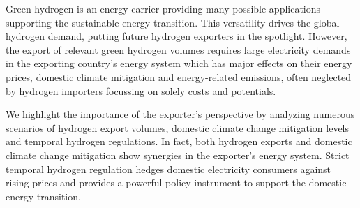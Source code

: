 
Green hydrogen is an energy carrier providing many possible applications supporting the sustainable energy transition. 
This versatility drives the global hydrogen demand, putting future hydrogen exporters in the spotlight. 
However, the export of relevant green hydrogen volumes requires large electricity demands in the exporting country's energy system which has major effects on their energy prices, domestic climate mitigation and energy-related emissions, often neglected by hydrogen importers focussing on solely costs and potentials.

We highlight the importance of the exporter's perspective by analyzing numerous scenarios of hydrogen export volumes, domestic climate change mitigation levels and temporal hydrogen regulations. In fact, both hydrogen exports and domestic climate change mitigation show synergies in the exporter's energy system. 
Strict temporal hydrogen regulation hedges domestic electricity consumers against rising prices and provides a powerful policy instrument to support the domestic energy transition.


